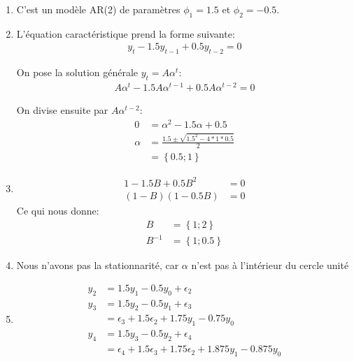 \begin{solution}{2.8}
  \begin{enumerate}
\item C'est un modèle AR(2) de paramètres $\phi_1=1.5$ et $\phi_2=-0.5$.
\item L'équation caractéristique prend la forme suivante:
  \begin{align*}
    y_t - 1.5 y_{t-1} + 0.5y_{t-2} = 0
  \end{align*}

  On pose la solution générale $y_t=A\alpha^t$:
  \begin{align*}
    A\alpha^t - 1.5 A\alpha^{t-1} + 0.5A\alpha^{t-2} = 0
  \end{align*}

  On divise ensuite par $A\alpha^{t-2}$:
  \begin{align*}
    0 &= \alpha^2 - 1.5 \alpha + 0.5\\
    \alpha &= \frac{1.5 \pm \sqrt{1.5^2-4*1*0.5}}{2} \\
    &= \left\{0.5 ; 1 \right\}
  \end{align*}

\item
  \begin{align*}
    1 - 1.5B + 0.5B^2 &= 0 \\
    (1-B)(1-0.5B) &= 0
  \end{align*}
  Ce qui nous donne:
  \begin{align*}
    B &= \left\{ 1;2 \right\} \\
    B^{-1} &= \left\{ 1;0.5 \right\}
  \end{align*}

\item Nous n'avons pas la stationnarité, car $\alpha$ n'est pas à l'intérieur du cercle unité

\item
  \begin{align*}
    y_2 &= 1.5 y_1 - 0.5y_0 + \epsilon_2 \\
    y_3 &= 1.5 y_2 - 0.5y_1 + \epsilon_3 \\
    &= \epsilon_3 + 1.5 \epsilon_2 + 1.75y_1 - 0.75 y_0 \\
    y_4 &= 1.5 y_3 - 0.5y_2 + \epsilon_4 \\
    &= \epsilon_4 + 1.5 \epsilon_3 + 1.75 \epsilon_2 + 1.875 y_1 - 0.875 y_0
  \end{align*}


\end{enumerate}
\end{solution}
